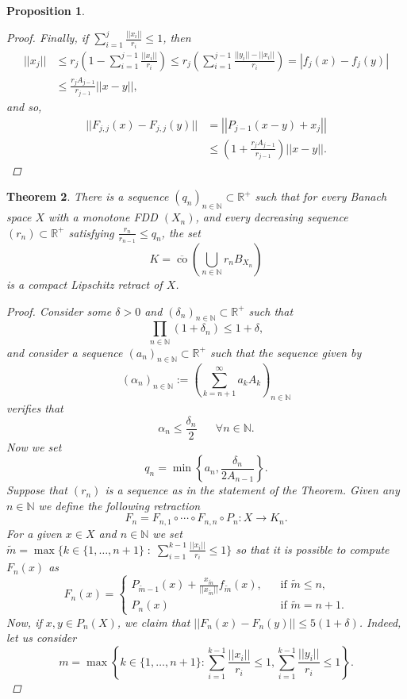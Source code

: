 \documentclass[11pt]{amsart}
\newcommand{\N}{\mathbb{N}}
\newcommand{\R}{\mathbb{R}}
\DeclareMathOperator{\co}{co}
\newcommand{\<}{\langle}
\renewcommand{\>}{\rangle}
\newtheorem{theorem}{Theorem}[section]
\newtheorem{prop}[theorem]{Proposition}
\theoremstyle{definition}
\theoremstyle{remark}
\numberwithin{equation}{section}
\def\R{{\mathbb R}}
\begin{document}
\begin{prop}
\begin{proof}
Finally, if $\sum\limits_{i=1}^{j}\frac{||x_i||}{r_i}\le1$, then
$$\begin{aligned}||x_j||&\le r_j\left( 1-\sum\limits_{i=1}^{j-1}\frac{||x_i||}{r_i} \right)\le r_j\left(\sum\limits_{i=1}^{j-1}\frac{||y_i||-||x_i||}{r_i}\right)=|f_j(x)-f_j(y)|\\
&\le \frac{r_jA_{j-1}}{r_{j-1}}||x-y||,\end{aligned}$$
and so,
$$\begin{aligned}||F_{j,j}(x)-F_{j,j}(y)||&=\left|\left| P_{j-1}(x-y)+x_j \right|\right|\\
&\le \left(1+\frac{r_jA_{j-1}}{r_{j-1}}\right)||x-y||.\end{aligned}$$
\end{proof}
\end{prop}

\begin{theorem}\label{theoFDDcompact}
There is a sequence $(q_n)_{n\in\N}\subset \R^+$ such that for every Banach space $X$ with a monotone FDD $(X_n)$, and every decreasing sequence $(r_n)\subset \R^+$ satisfying $\frac{r_n}{r_{n-1}}\le q_n$, the set
$$K=\overline{\co}\left(\bigcup\limits_{n\in\N}r_nB_{X_n}\right)$$
is a compact Lipschitz retract of $X$.
\begin{proof}
Consider some $\delta>0$ and $(\delta_n)_{n\in\N}\subset\R^+$ such that
$$\prod\limits_{n\in\N}(1+\delta_n)\le 1+\delta,$$
and consider a sequence $(a_n)_{n\in\N}\subset\R^+$ such that the sequence given by
$$(\alpha_n)_{n\in\N}:=\left(\sum\limits_{k=n+1}^\infty a_kA_k\right)_{n\in\N}$$ verifies that
$$\alpha_n\le\frac{\delta_n}{2}\;\;\;\;\;\;\forall n\in\N.$$
Now we set
$$q_n=\min\left\{a_n,\frac{\delta_n}{2A_{n-1}}\right\}.$$
Suppose that $(r_n)$ is a sequence as in the statement of the Theorem. Given any $n\in\N$ we define the following retraction
$$F_n=F_{n,1}\circ\cdots\circ F_{n,n}\circ P_n:X\rightarrow K_n.$$
For a given $x\in X$ and $n\in\N$ we set $\widetilde{m}=\max\Big\{k\in\{1,\dots,n+1\}\;:\;\sum\limits_{i=1}^{k-1}\frac{||x_i||}{r_i}\le1\Big\}$ so that it is possible to compute $F_n(x)$ as
$$F_n(x)=\begin{cases}P_{\widetilde{m}-1}(x)+\frac{x_{\widetilde{m}}}{||x_{\widetilde{m}}||}f_{\widetilde{m}}(x),\;\;\;&\text{if }\widetilde{m}\le n,\\
P_n(x)&\text{if }\widetilde{m}=n+1.\end{cases}$$
Now, if $x,y\in P_n(X)$, we claim that $||F_n(x)-F_n(y)||\le5(1+\delta)$. Indeed, let us consider
$$m=\max\left\{k\in\{1,\dots,n+1\}:\sum\limits_{i=1}^{k-1}\frac{||x_i||}{r_i}\le1,\sum\limits_{i=1}^{k-1}\frac{||y_i||}{r_i}\le1\right\}.$$


\end{proof}
\end{theorem}
\end{document}
